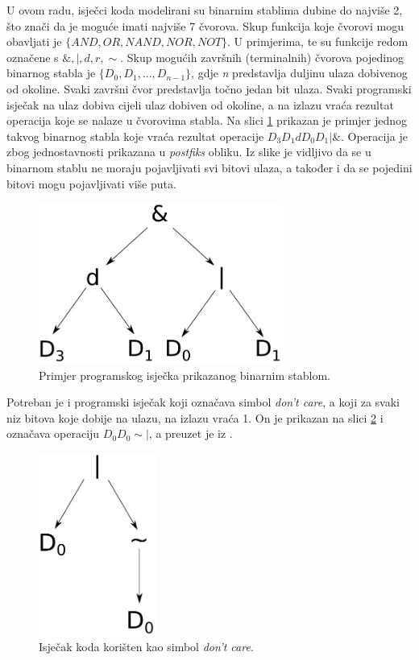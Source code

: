 \documentclass[times, utf8, zavrsni]{fer}
\begin{document}
U ovom radu, isječci koda modelirani su binarnim stablima dubine do najviše 2, što znači da je moguće imati najviše 7 čvorova.
Skup funkcija koje čvorovi mogu obavljati je $\{AND, OR, NAND, NOR, NOT\}$.
U primjerima, te su funkcije redom označene s $\&, |, d, r, \sim$.
Skup mogućih završnih (terminalnih) čvorova pojedinog binarnog stabla je $\{D_{0}, D_{1}, ..., D_{n - 1}\}$, gdje \emph{n} predstavlja duljinu ulaza dobivenog od okoline.
Svaki završni čvor predstavlja točno jedan bit ulaza.
Svaki programski isječak na ulaz dobiva cijeli ulaz dobiven od okoline, a na izlazu vraća rezultat operacija koje se nalaze u čvorovima stabla.
Na slici \ref{tree} prikazan je primjer jednog takvog binarnog stabla koje vraća rezultat operacije $D_{3}D_{1}dD_{0}D_{1}|\&$.
Operacija je zbog jednostavnosti prikazana u \emph{postfiks} obliku.
Iz slike je vidljivo da se u binarnom stablu ne moraju pojavljivati svi bitovi ulaza, a također i da se pojedini bitovi mogu pojavljivati više puta.
\begin{figure}[h]
    \centering
    \includegraphics[width=8cm]{img/tree.pdf}
    \caption{Primjer programskog isječka prikazanog binarnim stablom.}
    \label{tree}
\end{figure}

Potreban je i programski isječak koji označava simbol \emph{don't care}, a koji za svaki niz bitova koje dobije na ulazu, na izlazu vraća 1.
On je prikazan na slici \ref{dnc} i označava operaciju $D_{0}D_{0}\sim|$, a preuzet je iz \citep{4}.
\begin{figure}[h]
    \centering
    \includegraphics[height=6cm]{img/dnc.pdf}
    \caption{Isječak koda korišten kao simbol \emph{don't care}.}
    \label{dnc}
\end{figure}
\end{document}
